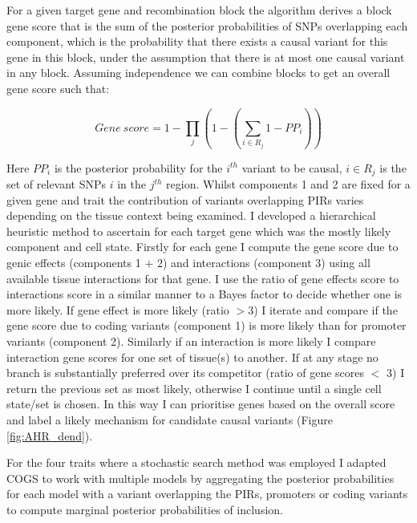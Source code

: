 \documentclass[a4paper,11pt]{report}
\begin{document}
For a given target gene and recombination block the algorithm derives a block gene score that is the sum of the posterior probabilities of SNPs overlapping each component, which is the probability that there exists a causal variant for this gene in this block, under the assumption that there is at most one causal variant in any block. Assuming independence we can combine blocks to get an overall gene score such that:

\begin{equation}
  Gene\ score = 1- \prod_j  \left(1-\left(\sum_{i \in R_j} 1-PP_i \right) \right)
  \label{eqn:cogs_score}
\end{equation}

Here $PP_i$ is the posterior probability for the $i^{th}$ variant to be causal, $i \in R_j$ is the set of relevant SNPs $i$ in the $j^{th}$ region. Whilst components 1 and 2 are fixed for a given gene and trait the contribution of variants overlapping PIRs varies depending on the tissue context being examined. I developed a hierarchical heuristic method to ascertain for each target gene which was the mostly likely component and cell state. Firstly for each gene I compute the gene score due to genic effects (components 1 $+$ 2) and interactions (component 3) using all available tissue interactions for that gene. I use the ratio of gene effects score to interactions score in a similar manner to a Bayes factor to decide whether one is more likely. If gene effect is more likely (ratio $>$3) I iterate and compare if the gene score due to coding variants (component 1) is more likely than for promoter variants (component 2). Similarly if an interaction is more likely I compare interaction gene scores for one set of tissue(s) to another. If at any stage no branch is substantially preferred over its competitor (ratio of gene scores $<$ 3) I return the previous set as most likely, otherwise I continue until a single cell state/set is chosen. In this way I can prioritise genes based on the overall score and label a likely mechanism for candidate causal variants (Figure \ref{fig:AHR_dend}).

For the four traits where a stochastic search method was employed I adapted COGS to work with multiple models by aggregating the posterior probabilities for each model with a variant overlapping the PIRs, promoters or coding variants to compute marginal posterior probabilities of inclusion.
\end{document}
